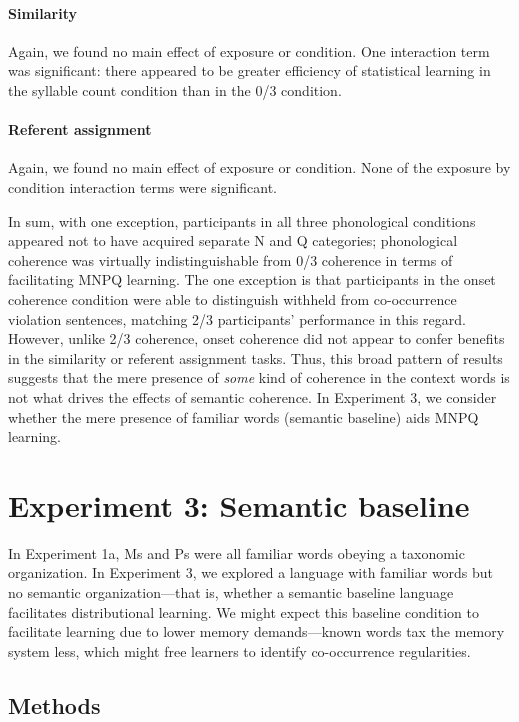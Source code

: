 \documentclass[man,longtable, floatmark]{my-apa6}
\begin{document}
\paragraph{Similarity}
Again, we found no main effect of exposure or condition. One interaction term was significant: there appeared to be greater efficiency of statistical learning in the syllable count condition than in the 0/3 condition.

\paragraph{Referent assignment}
Again, we found no main effect of exposure or condition. None of the exposure by condition interaction terms were significant.

In sum, with one exception, participants in all three phonological conditions appeared not to have acquired separate N and Q categories; phonological coherence was virtually indistinguishable from 0/3 coherence in terms of facilitating MNPQ learning. The one exception is that participants in the onset coherence condition were able to distinguish withheld from co-occurrence violation sentences, matching 2/3 participants' performance in this regard. However, unlike 2/3 coherence, onset coherence did not appear to confer benefits in the similarity or referent assignment tasks. Thus, this broad pattern of results suggests that the mere presence of \emph{some} kind of coherence in the context words is not what drives the effects of semantic coherence. In Experiment 3, we consider whether the mere presence of familiar words (semantic baseline) aids MNPQ learning.

\section{Experiment 3: Semantic baseline}

In Experiment 1a, Ms and Ps were all familiar words obeying a taxonomic organization. In Experiment 3, we explored a language with familiar words but no semantic organization---that is, whether a semantic baseline language facilitates distributional learning. We might expect this baseline condition to facilitate learning due to lower memory demands---known words tax the memory system less, which might free learners to identify co-occurrence regularities.

\subsection{Methods}
\end{document}
